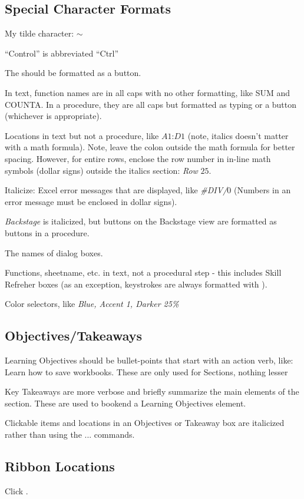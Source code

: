 \begin{enumerate}[resume]
\subsection{Special Character Formats}
My tilde character: $\sim$

``Control'' is abbreviated ``Ctrl''

The  should be formatted as a button.

In text, function names are in all caps with no other formatting, like SUM and COUNTA. In a procedure, they are all caps but formatted as typing or a button (whichever is appropriate).

Locations in text but not a procedure, like $ A1 $:$ D1 $ (note, italics doesn't matter with a math formula). Note, leave the colon outside the math formula for better spacing. However, for entire rows, enclose the row number in in-line math symbols (dollar signs) outside the italics section: \textit{Row} $ 25 $. 

Italicize:
  Excel error messages that are displayed, like \textit{\#DIV/$ 0 $} (Numbers in an error message must be enclosed in dollar signs).
    
  \textit{Backstage} is italicized, but buttons on the Backstage view are formatted as buttons in a procedure.
  
  The names of dialog boxes.
  
  Functions, sheetname, etc. in text, not a procedural step - this includes Skill Refreher boxes (as an exception, keystrokes are always formatted with \fmtKeystroke). 
  
  Color selectors, like \textit{Blue, Accent 1, Darker 25\%}

\subsection{Objectives/Takeaways}

Learning Objectives should be bullet-points that start with an action verb, like: Learn how to save workbooks. These are only used for Sections, nothing lesser

Key Takeaways are more verbose and briefly summarize the main elements of the section. These are used to bookend a Learning Objectives element.

Clickable items and locations in an Objectives or Takeaway box are italicized rather than using the \fmt... commands.

\subsection{Ribbon Locations}
Click .


\end{enumerate}
